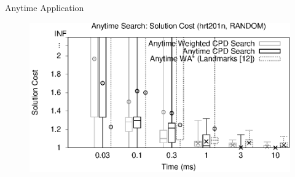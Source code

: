 \begin{frame}{Anytime Application}
    \begin{figure}
        \centering
        \includegraphics[width=1.0\textwidth]{src/images/anytime/anytime01}
        \label{fig:anytime01}
    \end{figure}
\end{frame}
